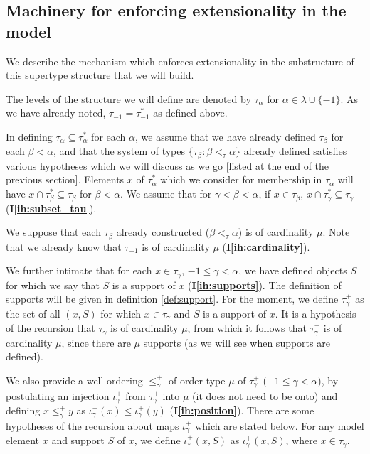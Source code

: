 \documentclass{article}
\theoremstyle{definition}
\theoremstyle{remark}
\newcommand{\ihref}[1]{(\textbf{I\ref{#1}})}
\begin{document}
\subsection{Machinery for enforcing extensionality in the model}\label{ss:extensionality_machinery}
  We describe the mechanism which enforces extensionality in the substructure of this supertype structure that we will build.

The levels of the structure we will define are denoted by $\tau_\alpha$ for \newline $\alpha \in \lambda \cup \{-1\}$.  As we have already noted, $\tau_{-1}=\tau^*_{-1}$ as defined above.

In defining $\tau_\alpha \subseteq \tau^*_\alpha$ for each $\alpha$, we assume that we have already defined $\tau_\beta$ for each $\beta<\alpha$, and that the system of types $\{\tau_\beta:\beta <_\tau \alpha\}$ already defined satisfies various hypotheses which we will discuss as we go [listed at the end of the previous section].
Elements $x$ of $\tau^*_\alpha$ which we consider for membership in $\tau_\alpha$ will have $x \cap \tau^*_\beta \subseteq \tau_\beta$ for $\beta<\alpha$.  We assume that for $\gamma<\beta<\alpha$, if $x \in \tau_\beta$, $x \cap \tau^*_\gamma \subseteq \tau_\gamma$ \ihref{ih:subset_tau}.

We suppose that each $\tau_\beta$ already constructed ($\beta<_\tau \alpha$) is of cardinality $\mu$.  Note that we already know that
$\tau_{-1}$ is of cardinality $\mu$ \ihref{ih:cardinality}.


We further intimate that for each $x \in \tau_\gamma$, $-1\leq \gamma<\alpha$, we have defined objects $S$ for which we say that $S$ is a support of $x$ \ihref{ih:supports}.  The definition of supports will be given in definition \ref{def:support}.  For the moment, we define $\tau_\gamma^+$ as the set of all $(x,S)$ for which $x \in \tau_\gamma$ and $S$ is a support of $x$.  It is a hypothesis of the recursion
that $\tau_\gamma$ is of cardinality $\mu$, from which it follows that  $\tau^+_\gamma$ is of cardinality $\mu$, since there are $\mu$ supports (as we will see when supports are defined).

We also provide a well-ordering $\leq^+_\gamma$ of order type $\mu$ of $\tau_\gamma^+$ ($-1 \leq \gamma <\alpha$), by postulating an injection $\iota^+_\gamma$ from $\tau_\gamma^+$ into $\mu$ (it does not need to be onto) and defining $x \leq^+_\gamma y$ as $\iota^+_\gamma(x) \leq \iota^+_\gamma(y)$ \ihref{ih:position}.   There are some hypotheses of the recursion about maps $\iota^+_\gamma$ which are stated below.   For any model element $x$ and support $S$ of $x$, we define $\iota^+_*(x,S)$ as $\iota^+_\gamma(x,S)$, where $x \in \tau_\gamma$.
\end{document}
